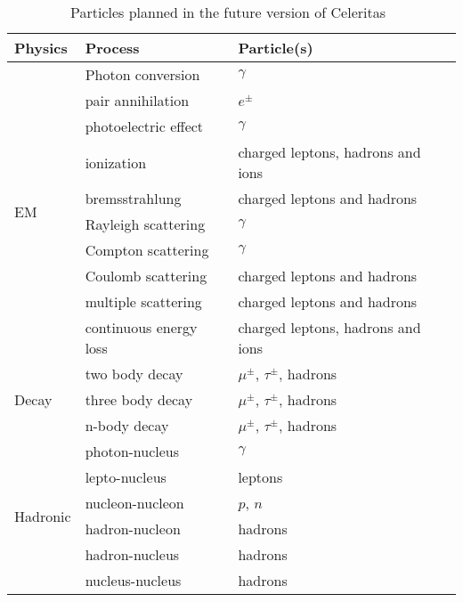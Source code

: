 \begin{table}[ht]
    \centering
    \begin{tabular}{lll}
        \hline
        \textbf{Physics}          & \textbf{Process}       & \textbf{Particle(s)}              \\
        \hline
        \multirow{10}{*}{EM}      & Photon conversion      & $\gamma$                          \\
                                & pair annihilation      & $e^\pm$                           \\
                                & photoelectric effect   & $\gamma$                          \\
                                & ionization             & charged leptons, hadrons and ions \\
                                & bremsstrahlung         & charged leptons and hadrons       \\
                                & Rayleigh scattering    & $\gamma$                          \\
                                & Compton scattering     & $\gamma$                          \\
                                & Coulomb scattering     & charged leptons and hadrons       \\
                                & multiple scattering    & charged leptons and hadrons       \\
                                & continuous energy loss & charged leptons, hadrons and ions \\
        \hline
        \multirow{3}{*}{Decay}  & two body decay         & $\mu^\pm$, $\tau^\pm$, hadrons    \\
                                & three body decay       & $\mu^\pm$, $\tau^\pm$, hadrons    \\
                                & n-body decay           & $\mu^\pm$, $\tau^\pm$, hadrons    \\
        \hline
        \multirow{6}{*}{Hadronic} & photon-nucleus         & $\gamma$                          \\
                                & lepto-nucleus          & leptons                           \\
                                & nucleon-nucleon        & $p$, $n$                          \\
                                & hadron-nucleon         & hadrons                           \\
                                & hadron-nucleus         & hadrons                           \\
                                & nucleus-nucleus        & hadrons                           \\
        \hline
    \end{tabular}
    \caption{Particles planned in the future version of Celeritas~\cite{exasclae-computing-ornl-evans}}
    \label{tab:analyze:atlas:particles:planned}
\end{table}

